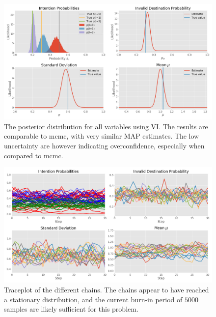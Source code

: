 \begin{figure}[h]
    \centering
    \includegraphics[width=\textwidth]{figures/example_vi.png}
    \caption{The posterior distribution for all variables using VI. The results are comparable to \acrshort{mcmc}, with very similar MAP estimates. The low uncertainty are however indicating overconfidence, especially when compared to \acrshort{mcmc}.}
    \label{fig:example_vi_posterior}
\end{figure}


\begin{figure}[h]
    \centering
    \includegraphics[width=\textwidth]{figures/example_mcmc_trace.png}
    \caption{Traceplot of the different chains. The chains appear to have reached a stationary distribution, and the current burn-in period of $5000$ samples are likely sufficient for this problem.}
    \label{fig:example_mcmc_trace}
\end{figure}


